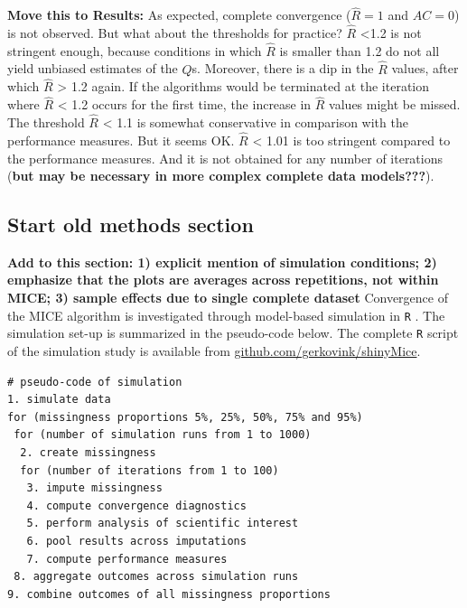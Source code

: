 \documentclass[Royal,times,sageh]{sagej}
\begin{document}
\textbf{Move this to Results:} As expected, complete convergence
(\(\widehat{R}=1\) and \(AC=0\)) is not observed. But what about the
thresholds for practice? \(\widehat{R}\) \textless1.2 is not stringent
enough, because conditions in which \(\widehat{R}\) is smaller than 1.2
do not all yield unbiased estimates of the \(Q\)s. Moreover, there is a
dip in the \(\widehat{R}\) values, after which \(\widehat{R}\)
\textgreater{} 1.2 again. If the algorithms would be terminated at the
iteration where \(\widehat{R}\) \textless{} 1.2 occurs for the first
time, the increase in \(\widehat{R}\) values might be missed. The
threshold \(\widehat{R}\) \textless{} 1.1 is somewhat conservative in
comparison with the performance measures. But it seems OK.
\(\widehat{R}\) \textless{} 1.01 is too stringent compared to the
performance measures. And it is not obtained for any number of
iterations (\textbf{but may be necessary in more complex complete data
models???}).

\hypertarget{start-old-methods-section}{%
\subsection{Start old methods section}\label{start-old-methods-section}}

\textbf{Add to this section: 1) explicit mention of simulation
conditions; 2) emphasize that the plots are averages across repetitions,
not within MICE; 3) sample effects due to single complete dataset}
Convergence of the MICE algorithm is investigated through model-based
simulation in \texttt{R} \citep[version 3.6.3;][]{R}. The simulation
set-up is summarized in the pseudo-code below. The complete \texttt{R}
script of the simulation study is available from
\href{https://github.com/gerkovink/shinyMice/tree/master/3.Thesis/1.SimulationStudy}{github.com/gerkovink/shinyMice}.

\begin{verbatim}
# pseudo-code of simulation 
1. simulate data 
for (missingness proportions 5%, 25%, 50%, 75% and 95%)
 for (number of simulation runs from 1 to 1000)
  2. create missingness
  for (number of iterations from 1 to 100)
   3. impute missingness
   4. compute convergence diagnostics
   5. perform analysis of scientific interest
   6. pool results across imputations
   7. compute performance measures
 8. aggregate outcomes across simulation runs 
9. combine outcomes of all missingness proportions
\end{verbatim}
\end{document}
